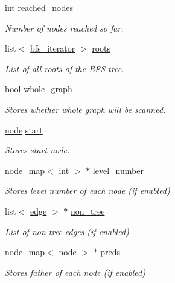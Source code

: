 \begin{DoxyCompactItemize}
int \mbox{\hyperlink{classbfs_ac3db80b59d5db049199936445a6c2da8}{reached\+\_\+nodes}}
\begin{DoxyCompactList}\small\item\em Number of nodes reached so far. \end{DoxyCompactList}\item 
list$<$ \mbox{\hyperlink{classbfs_acafce54954100cc7bc9f80eb318a7bee}{bfs\+\_\+iterator}} $>$ \mbox{\hyperlink{classbfs_a79d19028002766f7992fe94689217f99}{roots}}
\begin{DoxyCompactList}\small\item\em List of all roots of the B\+F\+S-\/tree. \end{DoxyCompactList}\item 
bool \mbox{\hyperlink{classbfs_a6c08fbcc90d71f1cbdd03a1cdaa9dc99}{whole\+\_\+graph}}
\begin{DoxyCompactList}\small\item\em Stores whether whole graph will be scanned. \end{DoxyCompactList}\item 
\mbox{\hyperlink{classnode}{node}} \mbox{\hyperlink{classbfs_af2ab561d9e60a9fc2e25b02d1f807f96}{start}}
\begin{DoxyCompactList}\small\item\em Stores start node. \end{DoxyCompactList}\item 
\mbox{\hyperlink{classnode__map}{node\+\_\+map}}$<$ int $>$ $\ast$ \mbox{\hyperlink{classbfs_aab92e9d128612c28324aafe4750dbc84}{level\+\_\+number}}
\begin{DoxyCompactList}\small\item\em Stores level number of each node (if enabled) \end{DoxyCompactList}\item 
list$<$ \mbox{\hyperlink{classedge}{edge}} $>$ $\ast$ \mbox{\hyperlink{classbfs_aa6783e3e2ac4235403b37df3ee3ee968}{non\+\_\+tree}}
\begin{DoxyCompactList}\small\item\em List of non-\/tree edges (if enabled) \end{DoxyCompactList}\item 
\mbox{\hyperlink{classnode__map}{node\+\_\+map}}$<$ \mbox{\hyperlink{classnode}{node}} $>$ $\ast$ \mbox{\hyperlink{classbfs_a3bac5ed333bb78a30a67099c3b94aa0c}{preds}}
\begin{DoxyCompactList}\small\item\em Stores father of each node (if enabled) \end{DoxyCompactList}\end{DoxyCompactItemize}


